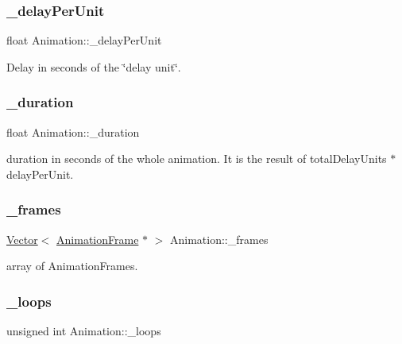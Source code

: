 \subsubsection{\texorpdfstring{\+\_\+delay\+Per\+Unit}{\_delayPerUnit}}
{\footnotesize\ttfamily float Animation\+::\+\_\+delay\+Per\+Unit\hspace{0.3cm}{\ttfamily [protected]}}

Delay in seconds of the \char`\"{}delay unit\char`\"{}. \mbox{\label{classAnimation_ae49a146ade26d6f57c0630ad28f0acb3}} 
\subsubsection{\texorpdfstring{\+\_\+duration}{\_duration}}
{\footnotesize\ttfamily float Animation\+::\+\_\+duration\hspace{0.3cm}{\ttfamily [protected]}}

duration in seconds of the whole animation. It is the result of total\+Delay\+Units $\ast$ delay\+Per\+Unit. \mbox{\label{classAnimation_a276e250f2ed2a8139d1796a2fcc8837c}} 
\subsubsection{\texorpdfstring{\+\_\+frames}{\_frames}}
{\footnotesize\ttfamily \hyperlink{classVector}{Vector}$<$ \hyperlink{classAnimationFrame}{Animation\+Frame} $\ast$ $>$ Animation\+::\+\_\+frames\hspace{0.3cm}{\ttfamily [protected]}}

array of Animation\+Frames. \mbox{\label{classAnimation_a5742f724ac7b63cce171f2435e672bb1}} 
\subsubsection{\texorpdfstring{\+\_\+loops}{\_loops}}
{\footnotesize\ttfamily unsigned int Animation\+::\+\_\+loops\hspace{0.3cm}{\ttfamily [protected]}}

